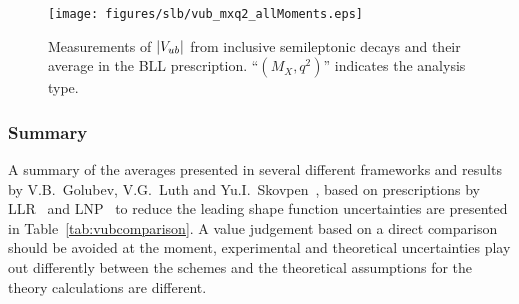 \begin{figure}
\begin{center}
\texttt{[image: figures/slb/vub\_mxq2\_allMoments.eps]}
\end{center}
\caption{Measurements of $|V_{ub}|$ from inclusive semileptonic decays 
and their average in the BLL prescription.
``$(M_X, q^2)$'' indicates the analysis type.}
\label{fig:BLL}
\end{figure}


\subsubsection{Summary}
A summary of the averages presented in several different
frameworks and results by V.B.~Golubev, V.G.~Luth and Yu.I.~Skovpen~\cite{Golubev:2007cs},
based on prescriptions by LLR~\cite{Leibovich:1999xf} and LNP~\cite{Lange:2005qn} 
to reduce the leading shape function uncertainties are presented in 
Table~\ref{tab:vubcomparison}.
A value judgement based on a direct comparison should be
avoided at the moment, experimental and theoretical uncertainties play out
differently between the schemes and the theoretical assumptions for the
theory calculations are different.






